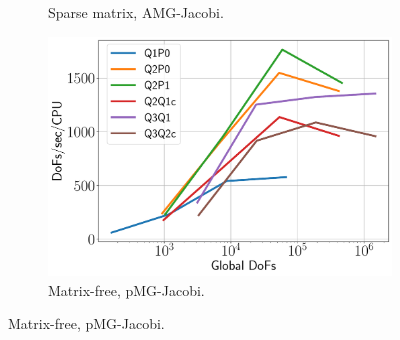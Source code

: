 \documentclass{beamer}
\begin{document}
\begin{frame}
\begin{figure}[H]
\begin{subfigure}{.5\textwidth}
			\caption{Sparse matrix, AMG-Jacobi.}
		\end{subfigure}%
		\begin{subfigure}{.5\textwidth}
			\centering
			\includegraphics[width=.8\textwidth]{../figs/efficiency-pmg-jac.pdf}
			\caption{Matrix-free, pMG-Jacobi.}
		\end{subfigure}
	\end{figure}	
\end{frame}
\end{document}
